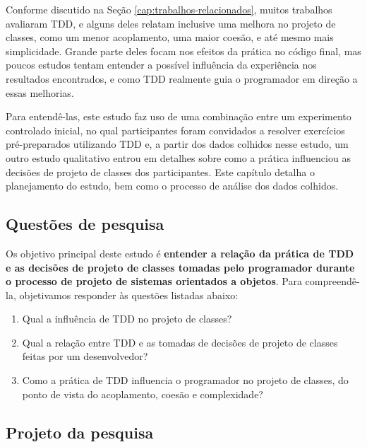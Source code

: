 \documentclass[conference]{IEEEtran}
\begin{document}
Conforme discutido na Seção \ref{cap:trabalhos-relacionados}, muitos 
trabalhos avaliaram TDD, e alguns deles relatam inclusive uma melhora
no projeto de classes, como um menor acoplamento, uma maior coesão, e até mesmo
mais simplicidade. 
Grande parte deles focam nos efeitos da prática no código final, mas poucos 
estudos tentam entender a possível influência da experiência
nos resultados encontrados, e como TDD realmente guia o programador 
em direção a essas melhorias.

Para entendê-las, este estudo faz uso de uma combinação entre um experimento 
controlado inicial, no qual participantes foram convidados a resolver exercícios 
pré-preparados utilizando TDD e, a partir dos dados colhidos nesse estudo, um outro
estudo qualitativo entrou em detalhes sobre como a prática influenciou as decisões de 
projeto de classes dos participantes. Este capítulo detalha o planejamento do estudo, 
bem como o processo de análise dos dados colhidos.

\subsection{Questões de pesquisa}

Os objetivo principal deste estudo é \textbf{entender a relação da prática de TDD 
e as decisões de projeto de classes tomadas pelo programador durante o processo de 
projeto de sistemas orientados a objetos}.
Para compreendê-la, objetivamos responder às questões listadas
abaixo:

\begin{enumerate}

	\item Qual a influência de TDD no projeto de classes?

	\item Qual a relação entre TDD e as tomadas de decisões de projeto de classes
	feitas por um desenvolvedor?

	\item Como a prática de TDD influencia o programador no 
	projeto de classes, do ponto de vista do acoplamento, coesão e complexidade?

\end{enumerate}

\subsection{Projeto da pesquisa}
\end{document}
